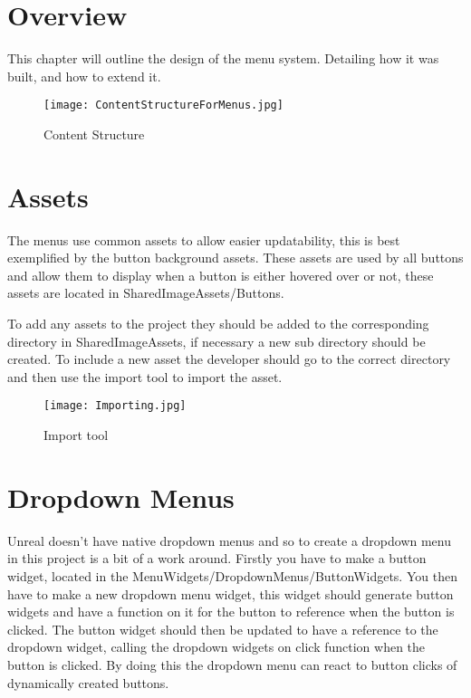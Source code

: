 \documentclass[../main.tex]{subfiles}
\begin{document}
\section{Overview}
This chapter will outline the design of the menu system. Detailing how it was built, and how to extend it.

\begin{figure}[H]
\texttt{[image: ContentStructureForMenus.jpg]}
\caption{Content Structure}
\end{figure}

\section{Assets}
The menus use common assets to allow easier updatability, this is best exemplified by the button background assets. These assets are used by all buttons and allow them to display when a button is either hovered over or not, these assets are located in SharedImageAssets/Buttons.

To add any assets to the project they should be added to the corresponding directory in SharedImageAssets, if necessary a new sub directory should be created. To include a new asset the developer should go to the correct directory and then use the import tool to import the asset.

\begin{figure}[H]
\texttt{[image: Importing.jpg]}
\caption{Import tool}
\end{figure}

\section{Dropdown Menus}
Unreal doesn't have native dropdown menus and so to create a dropdown menu in this project is a bit of a work around. Firstly you have to make a button widget, located in the MenuWidgets/DropdownMenus/ButtonWidgets. You then have to make a new dropdown menu widget, this widget should generate button widgets and have a function on it for the button to reference when the button is clicked. The button widget should then be updated to have a reference to the dropdown widget, calling the dropdown widgets on click function when the button is clicked. By doing this the dropdown menu can react to button clicks of dynamically created buttons.
\end{document}
